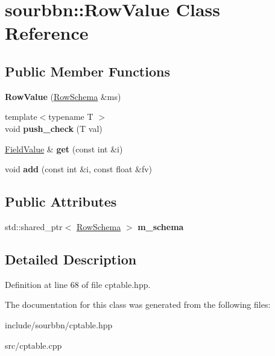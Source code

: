 \hypertarget{classsourbbn_1_1RowValue}{}\section{sourbbn\+:\+:Row\+Value Class Reference}
\label{classsourbbn_1_1RowValue}
\subsection*{Public Member Functions}
\begin{DoxyCompactItemize}
\item 
\mbox{\label{classsourbbn_1_1RowValue_a968c630c18d202a4ceba8708ad4637b4}} 
{\bfseries Row\+Value} (\hyperlink{classsourbbn_1_1RowSchema}{Row\+Schema} \&ms)
\item 
\mbox{\label{classsourbbn_1_1RowValue_a8880a193b6fed35b0c6b7546556c4401}} 
{\footnotesize template$<$typename T $>$ }\\void {\bfseries push\+\_\+check} (T val)
\item 
\mbox{\label{classsourbbn_1_1RowValue_a10853004e79506782104b0481cde660d}} 
\hyperlink{unionsourbbn_1_1FieldValue}{Field\+Value} \& {\bfseries get} (const int \&i)
\item 
\mbox{\label{classsourbbn_1_1RowValue_af1ad92eced0dd5568321e801bac69ac0}} 
void {\bfseries add} (const int \&i, const float \&fv)
\end{DoxyCompactItemize}
\subsection*{Public Attributes}
\begin{DoxyCompactItemize}
\item 
\mbox{\label{classsourbbn_1_1RowValue_a76b68e7f9aa13ef4f359c869e5df4386}} 
std\+::shared\+\_\+ptr$<$ \hyperlink{classsourbbn_1_1RowSchema}{Row\+Schema} $>$ {\bfseries m\+\_\+schema}
\end{DoxyCompactItemize}


\subsection{Detailed Description}


Definition at line 68 of file cptable.\+hpp.



The documentation for this class was generated from the following files\+:\begin{DoxyCompactItemize}
\item 
include/sourbbn/cptable.\+hpp\item 
src/cptable.\+cpp\end{DoxyCompactItemize}
